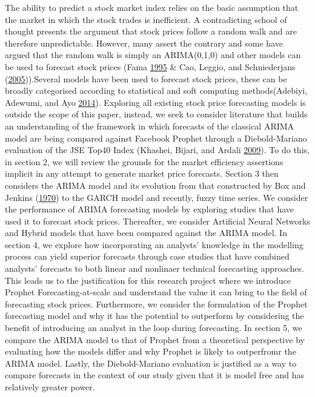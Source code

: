\documentclass[12pt,preprint, authoryear]{elsarticle}
\numberwithin{equation}{section}
\numberwithin{figure}{section}
\numberwithin{table}{section}
\begin{document}
The ability to predict a stock market index relies on the basic
assumption that the market in which the stock trades is inefficient. A
contradicting school of thought presents the argument that stock prices
follow a random walk and are therefore unpredictable. However, many
assert the contrary and some have argued that the random walk is simply
an ARIMA(0,1,0) and other models can be used to forecast stock prices
(Fama \protect\hyperlink{ref-fama1995random}{1995} \& Cao, Leggio, and
Schniederjans (\protect\hyperlink{ref-cao2005comparison}{2005})).Several
models have been used to forecast stock prices, these can be broadly
categorised according to statistical and soft computing methods(Adebiyi,
Adewumi, and Ayo \protect\hyperlink{ref-adebiyi2014comparison}{2014}).
Exploring all existing stock price forecasting models is outside the
scope of this paper, instead, we seek to consider literature that builds
an understanding of the framework in which forecasts of the classical
ARIMA model are being compared against Facebook Prophet through a
Diebold-Mariano evaluation of the JSE Top40 Index (Khashei, Bijari, and
Ardali \protect\hyperlink{ref-khashei2009improvement}{2009}). To do
this, in section 2, we will review the grounds for the market efficiency
assertions implicit in any attempt to generate market price forecasts.
Section 3 then considers the ARIMA model and its evolution from that
constructed by Box and Jenkins
(\protect\hyperlink{ref-box1970time}{1970}) to the GARCH model and
recently, fuzzy time series. We consider the performance of ARIMA
forecasting models by exploring studies that have used it to forecast
stock prices. Thereafter, we consider Artificial Neural Networks and
Hybrid models that have been compared against the ARIMA model. In
section 4, we explore how incorporating an analysts' knowledge in the
modelling process can yield superior forecasts through case studies that
have combined analysts' forecasts to both linear and nonlinaer technical
forecasting approaches. This leads us to the justification for this
research project where we introduce Prophet Forecasting-at-scale and
understand the value it can bring to the field of forecasting stock
prices. Furthermore, we consider the formulation of the Prophet
forecasting model and why it has the potential to outperform by
considering the benefit of introducing an analyst in the loop during
forecasting. In section 5, we compare the ARIMA model to that of Prophet
from a theoretical perspective by evaluating how the models differ and
why Prophet is likely to outperfromr the ARIMA model. Lastly, the
Diebold-Mariano evaluation is justified as a way to compare forecasts in
the context of our study given that it is model free and has relatively
greater power.
\end{document}
